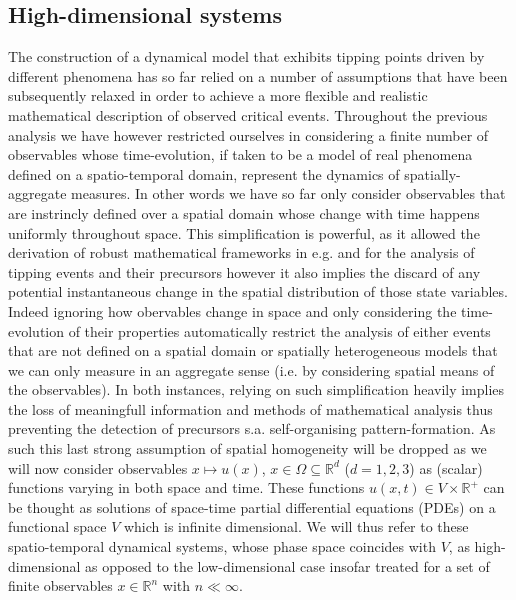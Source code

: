 \documentclass[../main.tex]{subfiles}
\begin{document}
\subsection{High-dimensional systems}\label{subsec3.2}
The construction of a dynamical model that exhibits tipping points driven by different phenomena has so far relied on a number of assumptions that have been subsequently relaxed in order to achieve a more flexible and realistic mathematical description of observed critical events. 
Throughout the previous analysis we have however restricted ourselves in considering a finite number of observables whose time-evolution, if taken to be a model of real phenomena defined on a spatio-temporal domain, represent the dynamics of spatially-aggregate measures.
In other words we have so far only consider observables that are instrincly defined over a spatial domain whose change with time happens uniformly throughout space. This simplification is powerful, as it allowed the derivation of robust mathematical frameworks in e.g. \cite{Kuehn11} and \cite{Ashwin12} for the analysis of tipping events and their precursors however it also implies the discard of any potential instantaneous change in the spatial distribution of those state variables.
Indeed ignoring how obervables change in space and only considering the time-evolution of their properties automatically restrict the analysis of either events that are not defined on a spatial domain or spatially heterogeneous models that we can only measure in an aggregate sense (i.e. by considering spatial means of the observables).
In both instances, relying on such simplification heavily implies the loss of meaningfull information and methods of mathematical analysis thus preventing the detection of precursors s.a. self-organising pattern-formation.
As such this last strong assumption of spatial homogeneity will be dropped as we will now consider observables $x\mapsto u(x)$, $x\in \Omega\subseteq\mathbb{R}^{d}$ ($d=1,2,3$) as (scalar) functions varying in both space and time.
These functions $u(x,t)\in V\times \mathbb{R}^{+}$ can be thought as solutions of space-time partial differential equations (PDEs) on a functional space $V$ which is infinite dimensional.
We will thus refer to these spatio-temporal dynamical systems, whose phase space coincides with $V$, as high-dimensional as opposed to the low-dimensional case insofar treated for a set of finite observables $x\in \mathbb{R}^{n}$ with $n\ll\infty$.
\end{document}
